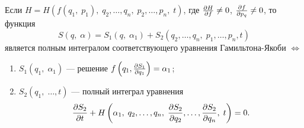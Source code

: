 \begin{teo}
	Если $H = H(f(q_1,\; p_1),\; q_2,\ldots,q_n,\; p_2,\ldots,p_n,\; t)$, где $\frac{\partial H}{\partial f} \neq 0$, $\frac{\partial f}{\partial p_q} \neq 0$, то функция 
	\[
		S(q,\;\alpha) = S_1(q,\; \alpha_1) + S_2(q_2,\ldots,q_n,\; p_1,\ldots,p_n, t)
	\]
	является полным интегралом соответствующего уравнения Гамильтона-Якоби $\Leftrightarrow$
	\begin{enumerate}
		\item $S_1(q_1,\; \alpha_1)$ --- решение $f\left(q_1, \frac{\partial S_1}{\partial q_1}\right) = \alpha_1$;
		\item $S_2(q_1,\; \ldots, t)$ --- полный интеграл уравнения \[
			\frac{\partial S_2}{\partial t} + H\left( \alpha_1,\; q_2,\ldots,q_n,\; \frac{\partial S_2}{\partial q_2},\ldots,\frac{\partial S_2}{\partial q_n},\; t \right) = 0.
		\]	
	\end{enumerate}
\end{teo}
